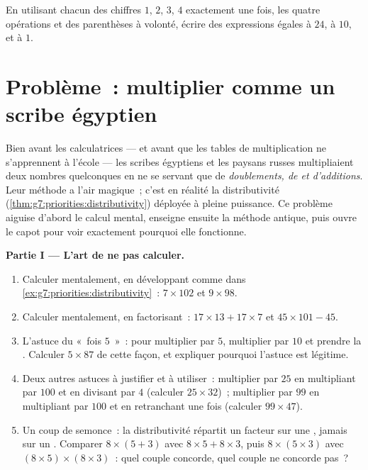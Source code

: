 \begin{exercise}[$\star\star\star$]\label{exo:g7:priorities:11}
En utilisant chacun des chiffres $1$, $2$, $3$, $4$ exactement une
fois, les quatre opérations et des parenthèses à volonté, écrire des
expressions égales à $24$, à $10$, et à $1$.
\end{exercise}

\section{Problème~: multiplier comme un scribe égyptien}

\begin{problem}
\label{pb:g7:priorities:1}
Bien avant les calculatrices --- et avant que les tables de
multiplication ne s'apprennent à l'école --- les scribes égyptiens et
les paysans russes multipliaient deux nombres quelconques en ne se
servant que de \emph{doublements, de  et d'additions}. Leur
méthode a l'air magique~; c'est en réalité la distributivité
(\cref{thm:g7:priorities:distributivity}) déployée à pleine
puissance. Ce problème aiguise d'abord le calcul mental, enseigne
ensuite la méthode antique, puis ouvre le capot pour voir exactement
pourquoi elle fonctionne.

\medskip
\noindent\textbf{Partie I --- L'art de ne pas calculer.}
\begin{enumerate}
  \item Calculer mentalement, en développant comme dans
        \cref{ex:g7:priorities:distributivity}~: $7 \times 102$ et
        $9 \times 98$.
  \item Calculer mentalement, en factorisant~:
        $17 \times 13 + 17 \times 7$ et $45 \times 101 - 45$.
  \item L'astuce du «~fois $5$~»~: pour multiplier par $5$,
        multiplier par $10$ et prendre la . Calculer
        $5 \times 87$ de cette façon, et expliquer pourquoi
        l'astuce est légitime.
  \item Deux autres astuces à justifier et à utiliser~: multiplier
        par $25$ en multipliant par $100$ et en divisant par $4$
        (calculer $25 \times 32$)~; multiplier par $99$ en
        multipliant par $100$ et en retranchant une fois (calculer
        $99 \times 47$).
  \item Un coup de semonce~: la distributivité répartit un facteur
        sur une \emph{}, jamais sur un . Comparer
        $8 \times (5 + 3)$ avec $8 \times 5 + 8 \times 3$, puis
        $8 \times (5 \times 3)$ avec
        $(8 \times 5) \times (8 \times 3)$~: quel couple concorde,
        quel couple ne concorde pas~?
\end{enumerate}


\end{problem}
